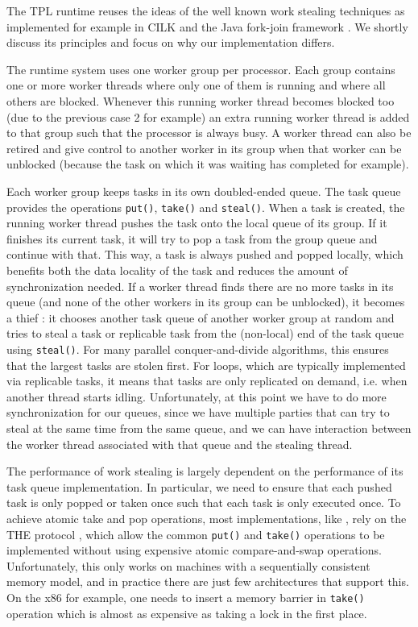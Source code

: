 
The TPL runtime reuses the ideas of the well known work stealing
techniques as implemented for example in CILK \cite{Frigo1998,
  Danaher2005} and the Java fork-join framework \cite{Lea2000,
  Lea2000a, Lea2004, Lea2006}. We shortly discuss its principles and
focus on why our implementation differs.

The runtime system uses one worker group per processor. Each group
contains one or more worker threads where only one of them is running
and where all others are blocked. Whenever this running worker thread
becomes blocked too (due to the previous case 2 for example) an extra
running worker thread is added to that group such that the processor
is always busy. A worker thread can also be retired and give control
to another worker in its group when that worker can be unblocked
(because the task on which it was waiting has completed for example).

Each worker group keeps tasks in its own doubled-ended queue. The task
queue provides the operations \lstinline!put()!, \lstinline!take()!
and \lstinline!steal()!. When a task is created, the running worker
thread pushes the task onto the local queue of its group. If it
finishes its current task, it will try to pop a task from the group
queue and continue with that. This way, a task is always pushed and
popped locally, which benefits both the data locality of the task and
reduces the amount of synchronization needed. If a worker thread finds
there are no more tasks in its queue (and none of the other workers in
its group can be unblocked), it becomes a thief : it chooses another
task queue of another worker group at random and tries to steal a task
or replicable task from the (non-local) end of the task queue using
\lstinline!steal()!. For many parallel conquer-and-divide algorithms,
this ensures that the largest tasks are stolen first. For loops, which
are typically implemented via replicable tasks, it means that tasks
are only replicated on demand, i.e. when another thread starts
idling. Unfortunately, at this point we have to do more
synchronization for our queues, since we have multiple parties that
can try to steal at the same time from the same queue, and we can have
interaction between the worker thread associated with that queue and
the stealing thread.

The performance of work stealing is largely dependent on the
performance of its task queue implementation. In particular, we need
to ensure that each pushed task is only popped or taken once such that
each task is only executed once. To achieve atomic take and pop
operations, most implementations, like \cite{Arora2001}, rely on the
THE protocol \cite{Dijkstra1965}, which allow the common
\lstinline!put()! and \lstinline!take()! operations to be implemented
without using expensive atomic compare-and-swap
operations. Unfortunately, this only works on machines with a
sequentially consistent memory model, and in practice there are just
few architectures that support this. On the x86 for example, one needs
to insert a memory barrier in \lstinline!take()! operation which is
almost as expensive as taking a lock in the first place.

